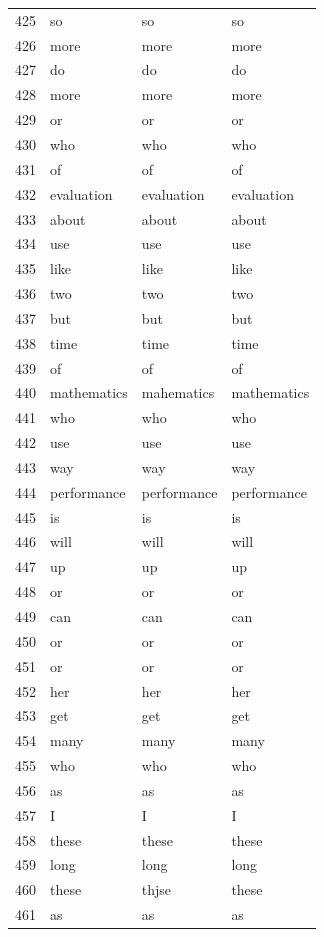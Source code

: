 \begin{longtable}{clll}
    425 & so & so & so \\
    426 & more & more & more \\
    427 & do & do & do \\
    428 & more & more & more \\
    429 & or & or & or \\
    430 & who & who & who \\
    431 & of & of & of \\
    432 & evaluation & evaluation & evaluation \\
    433 & about & about & about \\
    434 & use & use & use \\
    435 & like & like & like \\
    436 & two & two & two \\
    437 & but & but & but \\
    438 & time & time & time \\
    439 & of & of & of \\
    440 & mathematics & mahematics & mathematics \\
    441 & who & who & who \\
    442 & use & use & use \\
    443 & way & way & way \\
    444 & performance & performance & performance \\
    445 & is & is & is \\
    446 & will & will & will \\
    447 & up & up & up \\
    448 & or & or & or \\
    449 & can & can & can \\
    450 & or & or & or \\
    451 & or & or & or \\
    452 & her & her & her \\
    453 & get & get & get \\
    454 & many & many & many \\
    455 & who & who & who \\
    456 & as & as & as \\
    457 & I & I & I \\
    458 & these & these & these \\
    459 & long & long & long \\
    460 & these & thjse & these \\
    461 & as & as & as \\

\end{longtable}
